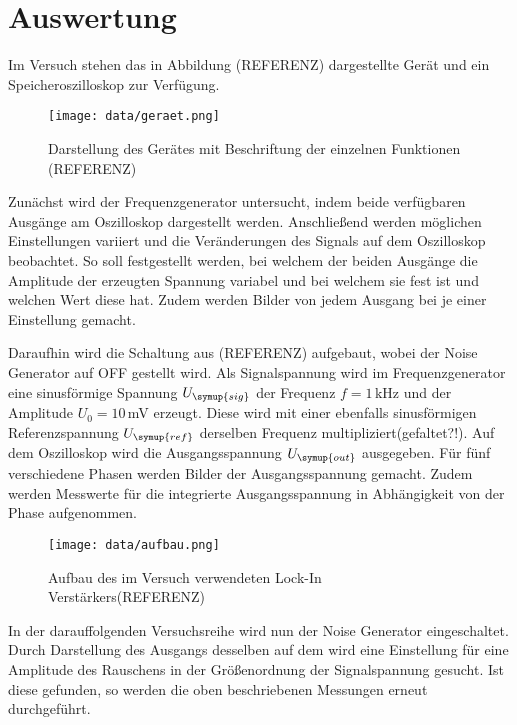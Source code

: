 \section{Auswertung}
\label{sec:Auswertung}

Im Versuch stehen das in Abbildung (REFERENZ) dargestellte Gerät und ein
Speicheroszilloskop zur Verfügung.

\begin{figure}
  \centering
  \texttt{[image: data/geraet.png]}
  \caption{Darstellung des Gerätes mit Beschriftung der einzelnen Funktionen
  (REFERENZ)}
  \label{fig:geraet}
\end{figure}


Zunächst wird der Frequenzgenerator untersucht, indem beide verfügbaren
Ausgänge am Oszilloskop dargestellt werden. Anschließend werden möglichen Einstellungen
variiert und die Veränderungen des Signals auf dem Oszilloskop beobachtet. So soll
festgestellt werden, bei welchem der beiden Ausgänge die Amplitude der erzeugten
Spannung variabel und bei welchem sie fest ist und welchen Wert diese hat. Zudem
werden Bilder von jedem Ausgang bei je einer Einstellung gemacht.

Daraufhin wird die Schaltung aus (REFERENZ) aufgebaut, wobei der Noise Generator
auf OFF gestellt wird. Als Signalspannung wird im Frequenzgenerator eine sinusförmige Spannung
$U_{\symup{sig}}$ der Frequenz $f=1$\,kHz und der Amplitude $U_0=10$\,mV erzeugt.
Diese wird mit  einer ebenfalls sinusförmigen Referenzspannung $U_{\symup{ref}}$
derselben Frequenz multipliziert(gefaltet?!). Auf dem Oszilloskop wird die Ausgangsspannung
$U_{\symup{out}}$ ausgegeben. Für fünf verschiedene Phasen werden Bilder der
Ausgangsspannung gemacht. Zudem werden Messwerte für die integrierte Ausgangsspannung
in Abhängigkeit von der Phase aufgenommen.

\begin{figure}
  \centering
  \texttt{[image: data/aufbau.png]}
  \caption{Aufbau des im Versuch verwendeten Lock-In Verstärkers(REFERENZ)}
  \label{fig:aufbau}
\end{figure}

In der darauffolgenden Versuchsreihe wird nun der Noise Generator eingeschaltet.
Durch Darstellung des Ausgangs desselben auf dem wird eine Einstellung für eine
Amplitude des Rauschens in der Größenordnung der Signalspannung gesucht. Ist diese
gefunden, so werden die oben beschriebenen Messungen erneut durchgeführt.
